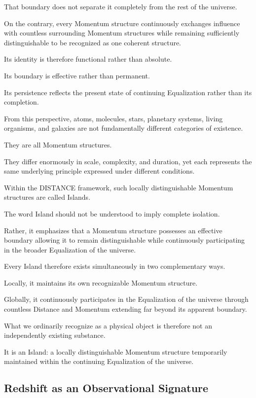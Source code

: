 That boundary does not separate it completely from the rest of the universe.

On the contrary, every Momentum structure continuously exchanges influence with countless surrounding Momentum structures while remaining sufficiently distinguishable to be recognized as one coherent structure.

Its identity is therefore functional rather than absolute.

Its boundary is effective rather than permanent.

Its persistence reflects the present state of continuing Equalization rather than its completion.

From this perspective, atoms, molecules, stars, planetary systems, living organisms, and galaxies are not fundamentally different categories of existence.

They are all Momentum structures.

They differ enormously in scale, complexity, and duration, yet each represents the same underlying principle expressed under different conditions.

Within the DISTANCE framework, such locally distinguishable Momentum structures are called Islands.

The word Island should not be understood to imply complete isolation.

Rather, it emphasizes that a Momentum structure possesses an effective boundary allowing it to remain distinguishable while continuously participating in the broader Equalization of the universe.

Every Island therefore exists simultaneously in two complementary ways.

Locally, it maintains its own recognizable Momentum structure.

Globally, it continuously participates in the Equalization of the universe through countless Distance and Momentum extending far beyond its apparent boundary.

What we ordinarily recognize as a physical object is therefore not an independently existing substance.

It is an Island: a locally distinguishable Momentum structure temporarily maintained within the continuing Equalization of the universe.












\subsection*{\textbf{Redshift as an Observational Signature}}

